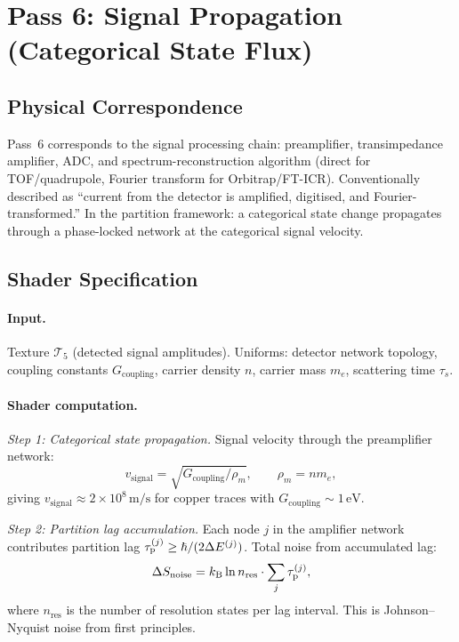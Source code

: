 \section{Pass 6: Signal Propagation (Categorical State Flux)}
\label{sec:ch22-pass6}

\subsection{Physical Correspondence}

Pass~6 corresponds to the signal processing chain: preamplifier, transimpedance
amplifier, ADC, and spectrum-reconstruction algorithm (direct for TOF/quadrupole,
Fourier transform for Orbitrap/FT-ICR).  Conventionally described as ``current
from the detector is amplified, digitised, and Fourier-transformed.''  In the
partition framework: a categorical state change propagates through a phase-locked
network at the categorical signal velocity.

\subsection{Shader Specification}

\paragraph{Input.}
Texture $\mathcal{T}_5$ (detected signal amplitudes).  Uniforms: detector
network topology, coupling constants $G_{\mathrm{coupling}}$, carrier density
$n$, carrier mass $m_e$, scattering time $\tau_s$.

\paragraph{Shader computation.}

\textit{Step 1: Categorical state propagation.}
Signal velocity through the preamplifier network:
\begin{equation}
  v_{\mathrm{signal}} = \sqrt{G_{\mathrm{coupling}}/\rho_m},
  \qquad \rho_m = nm_e, \label{eq:ch22-vsignal}
\end{equation}
giving $v_{\mathrm{signal}} \approx 2\times 10^8\,\mathrm{m/s}$ for copper
traces with $G_{\mathrm{coupling}} \sim 1\,\mathrm{eV}$.

\textit{Step 2: Partition lag accumulation.}
Each node $j$ in the amplifier network contributes partition lag
$\tau_{\mathrm{p}}^{(j)} \geq \hslash/(2\Delta E^{(j)})$.  Total noise from accumulated lag:
\begin{equation}
  \Delta S_{\mathrm{noise}} = k_{\mathrm{B}}\ln n_{\mathrm{res}}\cdot
    \sum_j \tau_{\mathrm{p}}^{(j)}, \label{eq:ch22-noise}
\end{equation}
where $n_{\mathrm{res}}$ is the number of resolution states per lag interval.
This is Johnson--Nyquist noise from first principles.

